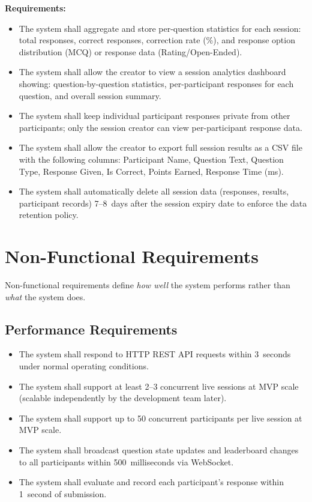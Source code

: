 \documentclass[12pt,a4paper]{article}
\begin{document}
\textbf{Requirements:}
\begin{itemize}
  \item[\textbf{FR47:}] The system shall aggregate and store per-question statistics
        for each session: total responses, correct responses, correction rate (\%),
        and response option distribution (MCQ) or response data (Rating/Open-Ended).
  \item[\textbf{FR48:}] The system shall allow the creator to view a session analytics
        dashboard showing: question-by-question statistics, per-participant responses
        for each question, and overall session summary.
  \item[\textbf{FR49:}] The system shall keep individual participant responses private
        from other participants; only the session creator can view per-participant
        response data.
  \item[\textbf{FR50:}] The system shall allow the creator to export full session
        results as a CSV file with the following columns: Participant Name, Question
        Text, Question Type, Response Given, Is Correct, Points Earned, Response
        Time (ms).
  \item[\textbf{FR51:}] The system shall automatically delete all session data
        (responses, results, participant records) 7--8~days after the session expiry
        date to enforce the data retention policy.
\end{itemize}

\section{Non-Functional Requirements}
Non-functional requirements define \emph{how well} the system performs rather than
\emph{what} the system does.

\subsection{Performance Requirements}
\begin{itemize}
  \item The system shall respond to HTTP REST API requests within 3~seconds under
        normal operating conditions.
  \item The system shall support at least 2--3 concurrent live sessions at MVP scale
        (scalable independently by the development team later).
  \item The system shall support up to 50 concurrent participants per live session
        at MVP scale.
  \item The system shall broadcast question state updates and leaderboard changes to
        all participants within 500~milliseconds via WebSocket.
  \item The system shall evaluate and record each participant's response within
        1~second of submission.
\end{itemize}
\end{document}
